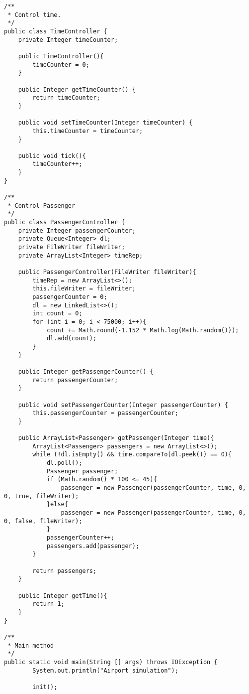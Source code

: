 \begin{lstlisting}
/**
 * Control time.
 */
public class TimeController {
    private Integer timeCounter;

    public TimeController(){
        timeCounter = 0;
    }

    public Integer getTimeCounter() {
        return timeCounter;
    }

    public void setTimeCounter(Integer timeCounter) {
        this.timeCounter = timeCounter;
    }

    public void tick(){
        timeCounter++;
    }
}

/**
 * Control Passenger
 */
public class PassengerController {
    private Integer passengerCounter;
    private Queue<Integer> dl;
    private FileWriter fileWriter;
    private ArrayList<Integer> timeRep;

    public PassengerController(FileWriter fileWriter){
        timeRep = new ArrayList<>();
        this.fileWriter = fileWriter;
        passengerCounter = 0;
        dl = new LinkedList<>();
        int count = 0;
        for (int i = 0; i < 75000; i++){
            count += Math.round(-1.152 * Math.log(Math.random()));
            dl.add(count);
        }
    }

    public Integer getPassengerCounter() {
        return passengerCounter;
    }

    public void setPassengerCounter(Integer passengerCounter) {
        this.passengerCounter = passengerCounter;
    }

    public ArrayList<Passenger> getPassenger(Integer time){
        ArrayList<Passenger> passengers = new ArrayList<>();
        while (!dl.isEmpty() && time.compareTo(dl.peek()) == 0){
            dl.poll();
            Passenger passenger;
            if (Math.random() * 100 <= 45){
                passenger = new Passenger(passengerCounter, time, 0, 0, true, fileWriter);
            }else{
                passenger = new Passenger(passengerCounter, time, 0, 0, false, fileWriter);
            }
            passengerCounter++;
            passengers.add(passenger);
        }

        return passengers;
    }

    public Integer getTime(){
        return 1;
    }
}

/**
 * Main method
 */
public static void main(String [] args) throws IOException {
        System.out.println("Airport simulation");

        init();


\end{lstlisting}
